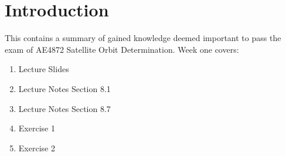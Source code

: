 \section{Introduction}\label{sec:introduction}
This contains a summary of gained knowledge deemed important to pass the exam of AE4872 Satellite Orbit Determination. Week one covers:
\begin{enumerate}
    \item Lecture Slides
    \item Lecture Notes Section 8.1
    \item Lecture Notes Section 8.7
    \item Exercise 1
    \item Exercise 2
\end{enumerate}
